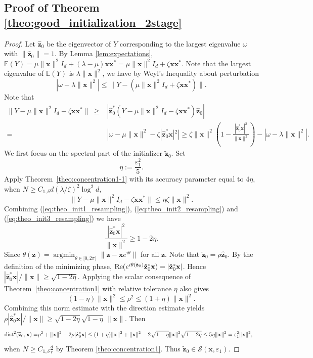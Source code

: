 \documentclass{article}
\renewcommand{\eqref}[1]{(\ref{#1})}
\newcommand{\E}{{\mathbb E}}
\newcommand{\calS}{{\mathcal S}}
\newcommand{\re}{{\rm Re}}
\newcommand{\dist}{{\rm dist}}
\newcommand{\vx}{{\mathbf x}}
\newcommand{\vz}{{\mathbf z}}
\newcommand{\0}{{\mathbf 0}}
\numberwithin{equation}{section}
\begin{document}
	\subsection{Proof of Theorem \ref{theo:good_initialization_2stage}}\label{subsec:proof_2stage_spectral_init}
	\begin{proof}
		Let $\hat{\vz}_0$ be the eigenvector of $Y$ corresponding to the largest eigenvalue $\omega$ with $\|\hat{\vz}_0\|=1$. By Lemma \ref{lem:expectations},  $\E(Y)=\mu\|\vx\|^2I_d+(\lambda-\mu)\vx\vx^*=\mu\|\vx\|^2I_d+\zeta\vx\vx^*$. Note that the largest eigenvalue of $\E(Y)$ is $\lambda\|\vx\|^2$, we have by Weyl's Inequality about perturbation
		\begin{equation}
			\label{eq:theo_init1_resampling}
			|\omega-\lambda\|\vx\|^2|\le \|Y-(\mu\|\vx\|^2I_d+\zeta\vx\vx^*)\|. 
		\end{equation}
		Note that
		\begin{equation}
			\label{eq:theo_init2_resampling}
			\begin{split}
				\|Y-\mu\|\vx\|^2I_d-\zeta\vx\vx^*\| \ \ge&|\hat{\vz}_0^*(Y-\mu\|\vx\|^2I_d-\zeta\vx\vx^*)\hat{\vz}_0|\\
				=&|\omega-\mu\|\vx\|^2-\zeta|\hat{\vz}_0 ^*\vx|^2|\ge\zeta\|\vx\|^2\left(1-\frac{|\hat{\vz}_0^*\vx|^2}{\|\vx\|^2}\right)-|\omega-\lambda\|\vx\|^2|.
			\end{split}
		\end{equation}
		We first focus on the spectral part of the initializer $\widetilde\vz_0$. Set
		\[
		\eta:=\frac{\varepsilon_1^2}{5}.
		\]
		Apply Theorem~\ref{theo:concentration1-1} with its accuracy parameter equal to $4\eta$, 
		when $N\ge C_{1,\delta} d(\lambda/\zeta)^2\log^2 d$,
		\begin{equation}
			\label{eq:theo_init3_resampling}
			\|Y-\mu\|\vx\|^2I_d-\zeta\vx\vx^*\|\le \eta\zeta\|\vx\|^2.
		\end{equation}
		Combining \eqref{eq:theo_init1_resampling}, \eqref{eq:theo_init2_resampling} and \eqref{eq:theo_init3_resampling} we have
		\[\frac{|\hat{\vz}_0^*\vx|^2}{\|\vx\|^2}\ge1-2\eta.\]
		Since $\theta(\vz)=\mathop{\arg\min}_{\theta\in[0,2\pi)}\|\vz-\vx e^{i\theta}\|$ for all $\vz$. 
		Note that $\widetilde \vz_0=\rho\hat \vz_0$. 
		By the definition of the minimizing phase,
		$\re(e^{i\theta(\hat\vz_0)}\hat\vz_0^*\vx)=|\hat\vz_0^*\vx|$.  Hence
		$|\hat\vz_0^*\vx|/\|\vx\|\ge\sqrt{1-2\eta}$. 
		Applying the scalar consequence of Theorem~\ref{theo:concentration1} with relative tolerance $\eta$ also gives
		\[
		(1-\eta)\|\vx\|^2\leq \rho^2\leq (1+\eta)\|\vx\|^2.
		\]
		Combining this norm estimate with the direction estimate yields
		$\rho|\hat{\vz}_0^*\vx|/\|\vx\|\ge\sqrt{1-2\eta}\sqrt{1-\eta}\,\|\vx\|$. 
		Then 
		\begin{equation*}
			\begin{split}
				\dist^2(\widetilde\vz_0,\vx)=&\rho^2+\|\vx\|^2-2\rho
				|\hat\vz_0^*\vx|
				\le(1+\eta)\|\vx\|^2+\|\vx\|^2-2\sqrt{1-\eta}\|\vx\|^2\sqrt{1-2\eta}
				\le5\eta\|\vx\|^2=\varepsilon_1^2\|\vx\|^2,
			\end{split}
		\end{equation*}
		when $N\ge C_{1,\delta}\frac dr$ by Theorem \ref{theo:concentration1}. Thus $\widetilde\vz_0\in\calS(\vx,\varepsilon_1)$.
		

\end{proof}
\end{document}
